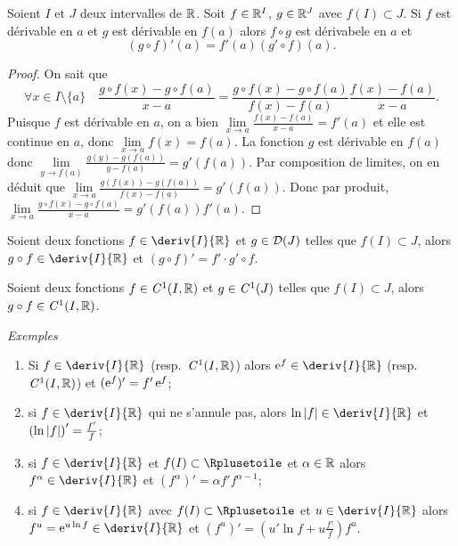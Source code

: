 \begin{theo}
  Soient $I$ et $J$ deux intervalles de $\mathbb{R}$. Soit $f \in \mathbb{R}^I$, $g \in \mathbb{R}^J$ avec $f(I) \subset J$. Si $f$ est dérivable en $a$ et $g$ est dérivable en $f(a)$ alors $f \circ g$ est dérivabele en $a$ et
  \begin{equation}
    (g \circ f)'(a)=f'(a) (g' \circ f)(a).
  \end{equation}
\end{theo}
\begin{proof}
  On sait que
  \begin{equation}
    \forall x \in I\setminus\{a\} \quad \frac{g \circ f(x) -g \circ f(a)}{x-a} = \frac{g \circ f(x) -g \circ f(a)}{f(x)-f(a)} \frac{f(x)-f(a)}{x-a}.
  \end{equation}
  Puisque $f$ est dérivable en $a$, on a bien $\lim\limits_{x \to a} \frac{f(x)-f(a)}{x-a} = f'(a)$ et elle est continue en $a$, donc $\lim\limits_{x \to a} f(x)=f(a)$. La fonction $g$ est dérivable en $f(a)$ donc $\lim\limits_{y \to f(a)} \frac{g(y)-g(f(a))}{y-f(a)} = g'(f(a))$. Par composition de limites, on en déduit que $\lim\limits_{x \to a} \frac{g(f(x))-g(f(a))}{f(x)-f(a)} = g'(f(a))$. Donc par produit, $\lim\limits_{x \to a} \frac{g \circ f(x) -g \circ f(a)}{x-a} = g'(f(a)) f'(a)$.
\end{proof}
\begin{corth}
  Soient deux fonctions $f \in \deriv{I}{\R}$ et $g \in \mathcal{D}(J)$ telles que $f(I) \subset J$, alors $g \circ f \in \deriv{I}{\R}$ et $(g\circ f)'=f' \cdot g' \circ f$.
\end{corth}
\begin{corth}
  Soient deux fonctions $f \in \mathit{C}^1(I,\mathbb{R})$ et $g \in \mathit{C}^1(J)$ telles que $f(I) \subset J$, alors $g \circ f \in \mathit{C}^1(I,\mathbb{R})$.
\end{corth}

\emph{Exemples}

\begin{enumerate}
\item Si $f \in \deriv{I}{\R}$ (resp.\ $\mathit{C}^1(I,\mathbb{R})$) alors $\e^f \in \deriv{I}{\R}$ (resp.\ $\mathit{C}^1(I,\mathbb{R})$) et $(\operatorname{e}^f)'=f' \operatorname{e}^f$;
\item si $f \in \deriv{I}{\R}$ qui ne s'annule pas, alors $\ln \abs{f} \in \deriv{I}{\R}$ et $\left(\ln\left\lvert f\right\rvert \right)'=\frac{f'}{f}$;
\item si $f \in \deriv{I}{\R}$ et $f(I) \subset \Rplusetoile$ et $\alpha \in \mathbb{R}$ alors $f^\alpha \in \deriv{I}{\R}$ et $(f^\alpha)'=\alpha f' f^{\alpha-1}$;
\item si $f \in \deriv{I}{\R}$ avec $f(I) \subset \Rplusetoile$ et $u \in \deriv{I}{\R}$ alors $f^u=\e^{u \ln f} \in \deriv{I}{\R}$ et $(f^u)'=\left(u'\ln f+u \frac{f'}{f}\right) f^u$.
\end{enumerate}


